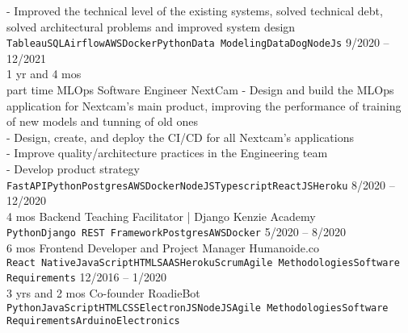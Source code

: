 \documentclass[9pt]{developercv} %
\begin{document}
\begin{entrylist}
{  - Improved the technical level of the existing systems, solved technical debt, solved architectural problems and improved system design
\\\texttt{Tableau}\slashsep\texttt{SQL}\slashsep\texttt{Airflow}\slashsep\texttt{AWS}\slashsep\texttt{Docker}\slashsep\texttt{Python}\slashsep\texttt{Data Modeling}\slashsep\texttt{DataDog}\slashsep\texttt{NodeJs}}
	\entry
		{9/2020 -- 12/2021\\\footnotesize{1 yr and 4 mos\\part time}}
		{MLOps Software Engineer}
		{NextCam}
		{- Design and build the MLOps application for Nextcam's main product, improving the performance of training of new models and tunning of old ones\\
- Design, create, and deploy the CI/CD for all Nextcam's applications\\
- Improve quality/architecture practices in the Engineering team\\
- Develop product strategy
\\\texttt{FastAPI}\slashsep\texttt{Python}\slashsep\texttt{Postgres}\slashsep\texttt{AWS}\slashsep\texttt{Docker}\slashsep\texttt{NodeJS}\slashsep\texttt{Typescript}\slashsep\texttt{ReactJS}\slashsep\texttt{Heroku}}
\entry
		{8/2020 -- 12/2020\\\footnotesize{4 mos}}
		{Backend Teaching Facilitator | Django}
		{Kenzie Academy}
		{
\\\texttt{Python}\slashsep\texttt{Django REST Framework}\slashsep\texttt{Postgres}\slashsep\texttt{AWS}\slashsep\texttt{Docker}}
	\entry
		{5/2020 -- 8/2020\\\footnotesize{6 mos}}
		{Frontend Developer and Project Manager}
		{Humanoide.co}
		{
\\\texttt{React Native}\slashsep\texttt{JavaScript}\slashsep\texttt{HTML}\slashsep\texttt{SAAS}\slashsep\texttt{Heroku}\slashsep\texttt{Scrum}\slashsep\texttt{Agile Methodologies}\slashsep\texttt{Software Requirements}}
	\entry
		{12/2016 -- 1/2020\\\footnotesize{3 yrs and 2 mos}}
		{Co-founder}
		{RoadieBot}
		{
\\\texttt{Python}\slashsep\texttt{JavaScript}\slashsep\texttt{HTML}\slashsep\texttt{CSS}\slashsep\texttt{ElectronJS}\slashsep\texttt{NodeJS}\slashsep\texttt{Agile Methodologies}\slashsep\texttt{Software Requirements}\slashsep\texttt{Arduino}\slashsep\texttt{Electronics}}
\end{entrylist}

\end{document}
